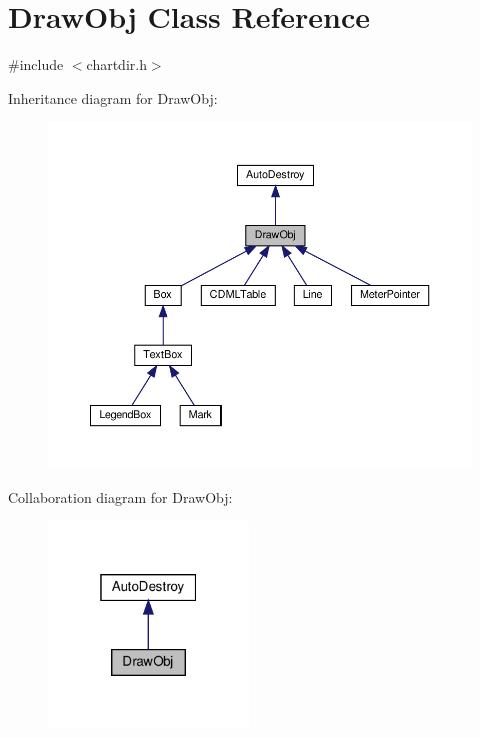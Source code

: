 \hypertarget{class_draw_obj}{}\section{Draw\+Obj Class Reference}
\label{class_draw_obj}


{\ttfamily \#include $<$chartdir.\+h$>$}



Inheritance diagram for Draw\+Obj\+:
\nopagebreak
\begin{figure}[H]
\begin{center}
\leavevmode
\includegraphics[width=350pt]{class_draw_obj__inherit__graph}
\end{center}
\end{figure}


Collaboration diagram for Draw\+Obj\+:
\nopagebreak
\begin{figure}[H]
\begin{center}
\leavevmode
\includegraphics[width=151pt]{class_draw_obj__coll__graph}
\end{center}
\end{figure}
